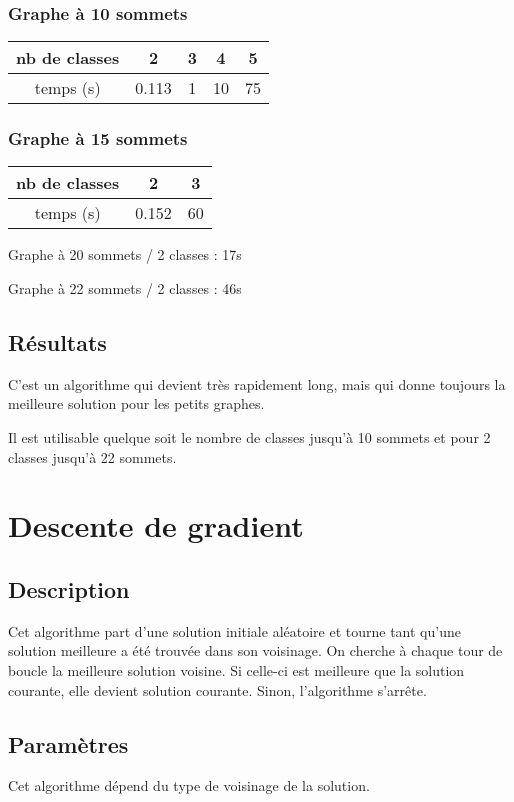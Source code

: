 \documentclass[12pt]{article}
\begin{document}
\subsubsection{Graphe à 10 sommets}

\begin{tabular}{|c|c|c|c|c|}
	\hline 
	nb de classes & 2 & 3 & 4 & 5 \\
	\hline
	temps (s) & 0.113 & 1 & 10 & 75 \\
	\hline
\end{tabular}

\subsubsection{Graphe à 15 sommets}

\begin{tabular}{|c|c|c |}
	\hline 
	nb de classes & 2 & 3 \\
	\hline
	temps (s) & 0.152 & 60 \\
	\hline
\end{tabular}

\bigskip
Graphe à 20 sommets / 2 classes : 17s

Graphe à 22 sommets / 2 classes : 46s

\subsection{Résultats}
C'est un algorithme qui devient très rapidement long, mais qui donne toujours la meilleure solution pour les petits graphes.

Il est utilisable quelque soit le nombre de classes jusqu’à 10 sommets et pour 2 classes jusqu’à 22 sommets.

\newpage

\section{Descente de gradient}
\subsection{Description}
Cet algorithme part d’une solution initiale aléatoire et tourne tant qu’une solution meilleure a été trouvée dans son voisinage. On cherche à chaque tour de boucle la meilleure solution voisine. Si celle-ci est meilleure que la solution courante, elle devient solution courante. Sinon, l’algorithme s’arrête.

\subsection{Paramètres}
Cet algorithme dépend du type de voisinage de la solution. 
\end{document}
